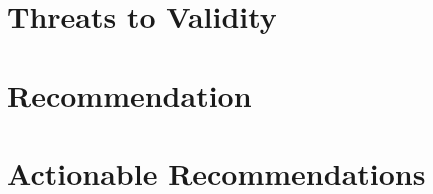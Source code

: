\documentclass[conference,a4paper]{IEEEtran}
\newif\ifguidance
\newcommand{\guidance}[1]{\ifguidance{\itshape\small #1\par\medskip}\fi}
\begin{document}
\section{Threats to Validity}
\guidance{Judge the threats the author lists, then name one they did not. If
you looked and found none, say where you looked.}

\section{Recommendation}
\guidance{One word: ACCEPT or REJECT. Those are the two options. Taking one
of them is what this section is for.

Then two or three lines saying why this verdict follows from what you wrote
above. Which side you take is yours.}

\section{Actionable Recommendations}
\guidance{For each issue you raised above, what the author should do. Concrete
enough to carry out before Fri 18 Dec.}
\end{document}
